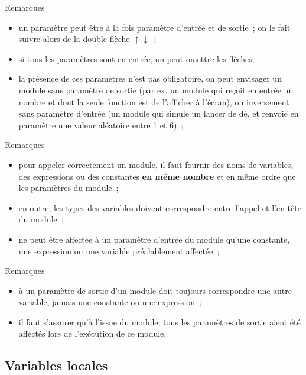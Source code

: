 \begin{frame}{Remarques}
	\begin{itemize}
	\item {
	{un paramètre peut être à la fois paramètre
	d’entrée et de sortie~; on le fait suivre alors de la double flèche
	}{$\uparrow \downarrow$}{~;}}
	\item {
	si tous les paramètres sont en entrée, on peut omettre les flèches;}
	\item {
	la présence de ces paramètres n’est pas obligatoire, on peut envisager
	un module sans paramètre de sortie (par ex. un module qui reçoit en
	entrée un nombre et dont la seule fonction est de l’afficher à
	l’écran), ou inversement sans paramètre d’entrée (un module qui simule
	un lancer de dé, et renvoie en paramètre une valeur aléatoire entre 1
	et 6)~;}
	\end{itemize}
\end{frame}

\begin{frame}{Remarques}
	\begin{itemize}
	\item {
	{pour appeler correctement un module, il faut
	fournir des noms de variables, des expressions ou des constantes
	}{\textbf{en même
	nombre}}{ et en même ordre que les paramètres
	du module~;}}
	\item {
	en outre, les types des variables doivent correspondre entre l’appel et
	l’en-tête du module~;}
	\item {
	ne peut être affectée à un paramètre d’entrée du module qu’une
	constante, une expression ou une variable préalablement affectée~;}
	\end{itemize}
\end{frame}

\begin{frame}{Remarques}
	\begin{itemize}
	\item {
	à un paramètre de sortie d’un module doit toujours correspondre une
	autre variable, jamais une constante ou une expression~;}
	\item {
	il faut s’assurer qu’à l’issue du module, tous les paramètres de sortie
	aient été affectés lors de l’exécution de ce module.}
	\end{itemize}

\end{frame}

\subsection{Variables locales}

